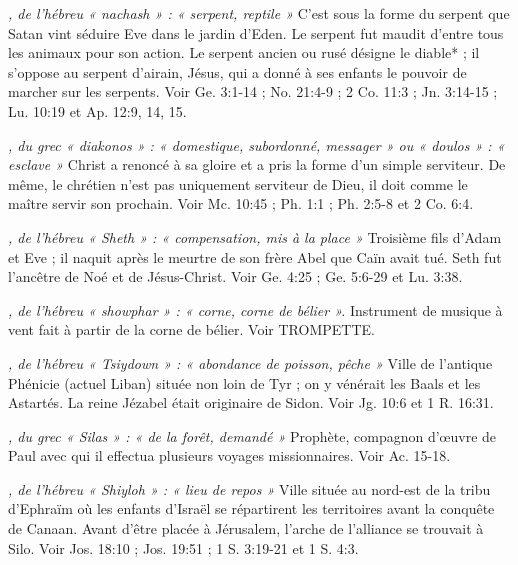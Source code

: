 \begin{multicols}{2}
{\textit{, de l'hébreu « nachash » : « serpent, reptile »}\newline
C'est sous la forme du serpent que Satan vint séduire Eve dans le jardin d'Eden. Le serpent fut maudit d'entre tous les animaux pour son action. Le serpent ancien ou rusé désigne le diable* ; il s'oppose au serpent d'airain, Jésus, qui a donné à ses enfants le pouvoir de marcher sur les serpents. Voir Ge. 3:1-14 ; No. 21:4-9 ; 2 Co. 11:3 ; Jn. 3:14-15 ; Lu. 10:19 et Ap. 12:9, 14, 15.

\textit{, du grec « diakonos » : « domestique, subordonné, messager » ou « doulos » : « esclave »}\newline
Christ a renoncé à sa gloire et a pris la forme d'un simple serviteur. De même, le chrétien n'est pas uniquement serviteur de Dieu, il doit comme le maître servir son prochain. Voir Mc. 10:45 ; Ph. 1:1 ; Ph. 2:5-8 et 2 Co. 6:4.

\textit{, de l'hébreu « Sheth » : « compensation, mis à la place »}\newline
Troisième fils d'Adam et Eve ; il naquit après le meurtre de son frère Abel que Caïn avait tué. Seth fut l'ancêtre de Noé et de Jésus-Christ. Voir Ge. 4:25 ; Ge. 5:6-29 et Lu. 3:38.

\textit{, de l'hébreu « showphar » : « corne, corne de bélier ».}\newline
Instrument de musique à vent fait à partir de la corne de bélier. Voir TROMPETTE.

\textit{, de l'hébreu « Tsiydown » : « abondance de poisson, pêche »}\newline
Ville de l'antique Phénicie (actuel Liban) située non loin de Tyr ; on y vénérait les Baals et les Astartés. La reine Jézabel était originaire de Sidon. Voir Jg. 10:6 et 1 R. 16:31.

\textit{, du grec « Silas » : « de la forêt, demandé »}\newline
Prophète, compagnon d'œuvre de Paul avec qui il effectua plusieurs voyages missionnaires. Voir Ac. 15-18.

\textit{, de l'hébreu « Shiyloh » : « lieu de repos »}\newline
Ville située au nord-est de la tribu d'Ephraïm où les enfants d'Israël se répartirent les territoires avant la conquête de Canaan. Avant d'être placée à Jérusalem, l'arche de l'alliance se trouvait à Silo. Voir Jos. 18:10 ; Jos. 19:51 ; 1 S. 3:19-21 et 1 S. 4:3.

}
\end{multicols}
